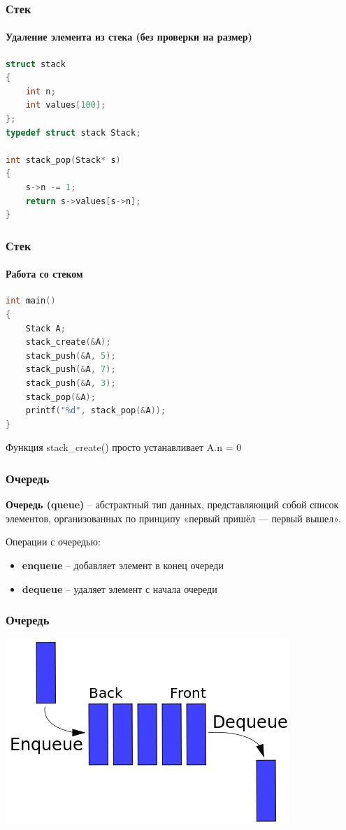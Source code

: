 \documentclass[12pt,pdf,hyperref={unicode}]{beamer}
\begin{document}
\begin{frame}[fragile]
\frametitle{Стек} 
\framesubtitle{Удаление элемента из стека (без проверки на размер)} 
\begin{lstlisting}[language=C++,basicstyle=\ttfamily,keywordstyle=\color{blue}]
struct stack 
{
    int n;
    int values[100];
};
typedef struct stack Stack;

int stack_pop(Stack* s)
{
    s->n -= 1;
    return s->values[s->n];
}
\end{lstlisting}
\end{frame}

\begin{frame}[fragile]
\frametitle{Стек} 
\framesubtitle{Работа со стеком} 
\begin{lstlisting}[language=C++,basicstyle=\ttfamily,keywordstyle=\color{blue}]
int main()
{
    Stack A;
    stack_create(&A);
    stack_push(&A, 5);
    stack_push(&A, 7);
    stack_push(&A, 3);
    stack_pop(&A);
    printf("%d", stack_pop(&A));
}
\end{lstlisting}
Функция stack\_create() просто устанавливает A.n = 0
\end{frame}

\begin{frame}[fragile]
\frametitle{Очередь} 
\textbf{Очередь (queue)} -- абстрактный тип данных, представляющий собой список элементов, организованных по принципу «первый пришёл — первый вышел». 

Операции с очередью:
\begin{itemize}
\item \textbf{enqueue} -- добавляет элемент в конец очереди
\item \textbf{dequeue} -- удаляет элемент с начала очереди
\end{itemize}
\end{frame}

\begin{frame}[fragile]
\frametitle{Очередь} 
\begin{center}
\includegraphics[width=0.8\linewidth]{images/queue.png}
\end{center}
\end{frame}
\end{document}
